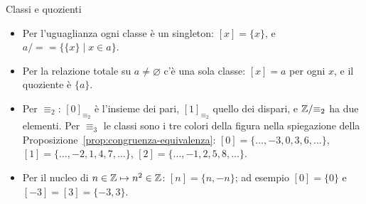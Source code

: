 \begin{esempio}{Classi e quozienti}
    \begin{itemize}
        \item Per l'uguaglianza ogni classe è un singleton: $[x] = \{x\}$, e $a/{=} = \{\{x\} \mid x \in a\}$.
        \item Per la relazione totale su $a \neq \varnothing$ c'è una sola classe: $[x] = a$ per ogni $x$, e il quoziente è $\{a\}$.
        \item Per $\equiv_2$: $[0]_{\equiv_2}$ è l'insieme dei pari, $[1]_{\equiv_2}$ quello dei dispari, e $\mathbb{Z}/{\equiv_2}$ ha due elementi.
              Per $\equiv_3$ le classi sono i tre colori della figura nella spiegazione della
              Proposizione~\ref{prop:congruenza-equivalenza}: $[0] = \{\dots, -3, 0, 3, 6, \dots\}$, $[1] = \{\dots, -2, 1, 4, 7, \dots\}$,
              $[2] = \{\dots, -1, 2, 5, 8, \dots\}$.
        \item Per il nucleo di $n \in \mathbb{Z} \mapsto n^2 \in \mathbb{Z}$: $[n] = \{n, -n\}$; ad esempio $[0] = \{0\}$ e $[-3] = [3] = \{-3, 3\}$.
    \end{itemize}
\end{esempio}

